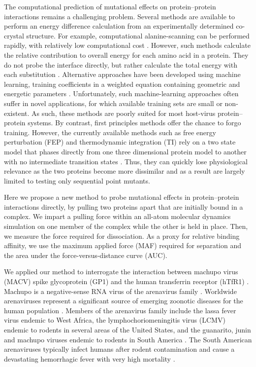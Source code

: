 \documentclass[12pt]{article}
\begin{document}
The computational prediction of mutational effects on protein--protein interactions remains a challenging problem. Several methods are available to perform an energy difference calculation from an experimentally determined co-crystal structure. For example, computational alanine-scanning can be performed rapidly, with relatively low computational cost \citep{Grant2011,Kortemme2004}. However, such methods calculate the relative contribution to overall energy for each amino acid in a protein. They do not probe the interface directly, but rather calculate the total energy with each substitution \citep{Grant2011,Kortemme2004}. Alternative approaches have been developed using machine learning, training coefficients in a weighted equation containing geometric and energetic parameters \citep{Vreven2011,Vreven2012,Bajaj2011,Hwang2010}. Unfortunately, such machine-learning approaches often suffer in novel applications, for which available training sets are small or non-existent. As such, these methods are poorly suited for most host-virus protein--protein systems. By contrast, first principles methods offer the chance to forgo training. However, the currently available methods such as free energy perturbation (FEP) and thermodynamic integration (TI) rely on a two state model that phases directly from one three dimensional protein model to another with no intermediate transition states \citep{Gilson1997,Lu2004}. Thus, they can quickly lose physiological relevance as the two proteins become more dissimilar and as a result are largely limited to testing only sequential point mutants. 

Here we propose a new method to probe mutational effects in protein--protein interactions directly, by pulling two proteins apart that are initially bound in a complex. We impart a pulling force within an all-atom molecular dynamics simulation on one member of the complex while the other is held in place. Then, we measure the force required for dissociation. As a proxy for relative binding affinity, we use the maximum applied force (MAF) required for separation and the area under the force-versus-distance curve (AUC). 

We applied our method to interrogate the interaction between machupo virus (MACV) spike glycoprotein (GP1) and the human transferrin receptor (hTfR1) \citep{Abraham2010,Charrel2003}. Machupo is a negative-sense RNA virus of the arenavirus family \citep{Charrel2003}. Worldwide arenaviruses represent a significant source of emerging zoonotic diseases for the human population \citep{Charrel2003}. Members of the arenavirus family include the lassa fever virus endemic to West Africa, the lymphochoriomeningitis virus (LCMV) endemic to rodents in several areas of the United States, and the guanarito, junin and machupo viruses endemic to rodents in South America \citep{Charrel2003}. The South American arenaviruses typically infect humans after rodent contamination and cause a devastating hemorrhagic fever with very high mortality \citep{Charrel2003}.
\end{document}
